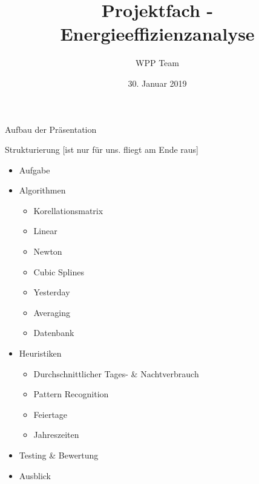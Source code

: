 \documentclass{beamer}           %
\title[WPP]{Projektfach - Energieeffizienzanalyse}
\author[Team]{WPP Team}
\institute{Hochschule Niederrhein - Fachbereich Elektrotechnik \& Informatik}
\date{30. Januar 2019}
\begin{document}
\frame[plain]{\titlepage}

\begin{frame}{Aufbau der Präsentation}
\tableofcontents  
\end{frame}

\begin{frame}{Strukturierung [ist nur für uns. fliegt am Ende raus]}
	\begin{itemize}
		\item Aufgabe %
		\item Algorithmen %
		\begin{itemize}
			\item Korellationsmatrix %
			\item Linear %
			\item Newton %
			\item Cubic Splines %
			\item Yesterday %
			\item Averaging %
			\item Datenbank %
		\end{itemize}
		\item Heuristiken %
		\begin{itemize}
			\item Durchschnittlicher Tages- \& Nachtverbrauch %
			\item Pattern Recognition %
			\item Feiertage %
			\item Jahreszeiten %
		\end{itemize}
		\item Testing \& Bewertung %
		\item Ausblick %
	\end{itemize}
\end{frame}



\begin{frame}{}
\fontsize{24pt}{12pt}\selectfont
{}
\end{frame}
\end{document}
